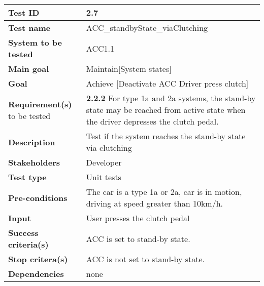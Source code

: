 	\begin{table}[H]
		\begin{tabular}{| p{4cm} | p{10cm} |}
			\hline
			\rowcolor{gray}
			{\bf Test ID} & 2.7 \\ \hline
			{\bf Test name} & ACC\_standbyState\_viaClutching \\ \hline
			{\bf System to be tested} & ACC1.1\\ \hline
			{\bf Main goal} & Maintain[System states] \\ \hline
			{\bf Goal} & Achieve [Deactivate ACC Driver press clutch] \\ \hline
			{\bf Requirement(s)} to be tested & {\bf 2.2.2} For type 1a and 2a systems, 
			the stand-by state may be reached from active state when the driver depresses 
			the clutch pedal.\\ \hline
			{\bf Description} & Test if the system reaches the stand-by state via clutching
			\\ \hline
			{\bf Stakeholders} & Developer \\ \hline
			{\bf Test type} & Unit tests \\ \hline
			{\bf Pre-conditions} & The car is a type 1a or 2a, car is in motion, driving 
			at speed greater than 10km/h.\\ \hline
			{\bf Input} & User presses the clutch pedal\\ \hline
			{\bf Success criteria(s)} & ACC is set to stand-by state. \\ \hline
			{\bf Stop critera(s)} & ACC is not set to stand-by state.\\ \hline
			{\bf Dependencies} & none \\ \hline
		\end{tabular}
	\end{table}

